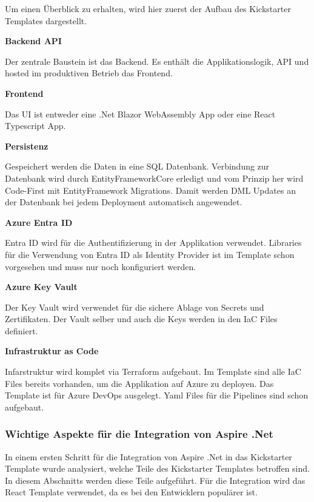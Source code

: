             Um einen Überblick zu erhalten, wird hier zuerst der Aufbau des Kickstarter Templates dargestellt.

            \textbf{Backend API}

            Der zentrale Baustein ist das Backend. Es enthält die Applikationslogik, API und hosted im produktiven Betrieb das Frontend.

            \textbf{Frontend}

            Das UI ist entweder eine .Net Blazor WebAssembly App oder eine React Typescript App. 

            \textbf{Persistenz}
            
            Gespeichert werden die Daten in eine SQL Datenbank. Verbindung zur Datenbank wird durch EntityFrameworkCore erledigt und vom Prinzip her wird Code-First mit EntityFramework Migrations. Damit werden DML Updates an der Datenbank bei jedem Deployment automatisch angewendet.

            \textbf{Azure Entra ID}
            
            Entra ID wird für die Authentifizierung in der Applikation verwendet. Libraries für die Verwendung von Entra ID als Identity Provider ist im Template schon vorgesehen und muss nur noch konfiguriert werden.

            \textbf{Azure Key Vault}

            Der Key Vault wird verwendet für die sichere Ablage von Secrets und Zertifikaten. Der Vault selber und auch die Keys werden in den IaC Files definiert.

            \textbf{Infrastruktur as Code}

            Infarstruktur wird komplet via Terraform aufgebaut. Im Template sind alle IaC Files bereits vorhanden, um die Applikation auf Azure zu deployen. Das Template ist für Azure DevOps ausgelegt. Yaml Files für die Pipelines sind schon aufgebaut.

        \subsubsection{Wichtige Aspekte für die Integration von Aspire .Net}

            In einem ersten Schritt für die Integration von Aspire .Net in das Kickstarter Template wurde analysiert, welche Teile des Kickstarter Templates betroffen sind. In diesem Abschnitts werden diese Teile aufgeführt. Für die Integration wird das React Template verwendet, da es bei den Entwicklern populärer ist. 

